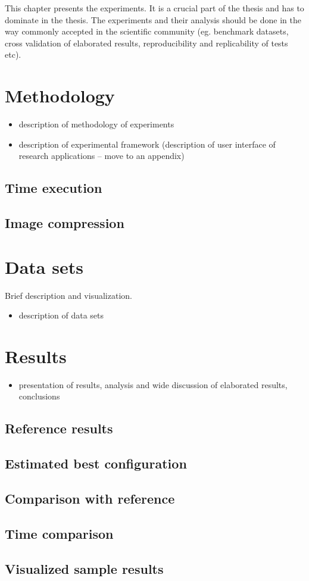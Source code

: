 This chapter presents the experiments. It is a crucial part of the thesis and has to dominate in the thesis. 
The experiments and their analysis should be done in the way commonly accepted in the scientific community (eg. benchmark datasets, cross validation of elaborated results, reproducibility and replicability of tests etc).

\section{Methodology}

\begin{itemize}
\item description of methodology of experiments
\item description of experimental framework (description of user interface of research applications – move to an appendix)
\end{itemize}

\subsection{Time execution}

\subsection{Image compression}


\section{Data sets}

Brief description and visualization. 

\begin{itemize}
\item description of data sets
\end{itemize}


\section{Results}

\begin{itemize}
	\item presentation of results, analysis and wide discussion of elaborated results, conclusions
\end{itemize}

\subsection{Reference results}

\subsection{Estimated best configuration}

\subsection{Comparison with reference}

\subsection{Time comparison}

\subsection{Visualized sample results}
